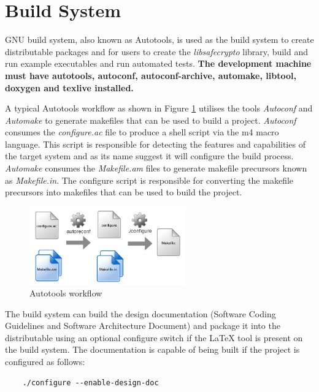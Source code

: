 \newpage
\section{Build System}

GNU build system, also known as Autotools, is used as the build system to create distributable packages and for users to create the \textit{libsafecrypto} library, build and run example executables and run automated tests. \textbf{The development machine must have autotools, autoconf, autoconf-archive, automake, libtool, doxygen and texlive installed.}

A typical Autotools workflow as shown in Figure \ref{fig:autotools_workflow} utilises the tools \textit{Autoconf} and \textit{Automake} to generate makefiles that can be used to build a project. \textit{Autoconf} consumes the \textit{configure.ac} file to produce a shell script via the m4 macro language. This script is responsible for detecting the features and capabilities of the target system and as its name suggest it will configure the build process. \textit{Automake} consumes the \textit{Makefile.am} files to generate makefile precursors known as \textit{Makefile.in}. The configure script is responsible for converting the makefile precursors into makefiles that can be used to build the project.

\begin{figure}[H]
\centering
\includegraphics[width=0.6\textwidth]{autotools_workflow.png}
\caption{Autotools workflow}
\label{fig:autotools_workflow}
\end{figure}

The build system can build the design documentation (Software Coding Guidelines and Software Architecture Document) and package it into the distributable using an optional configure switch if the LaTeX tool is present on the build system. The documentation is capable of being built if the project is configured as follows:

\begin{verbatim}
    ./configure --enable-design-doc
\end{verbatim}


